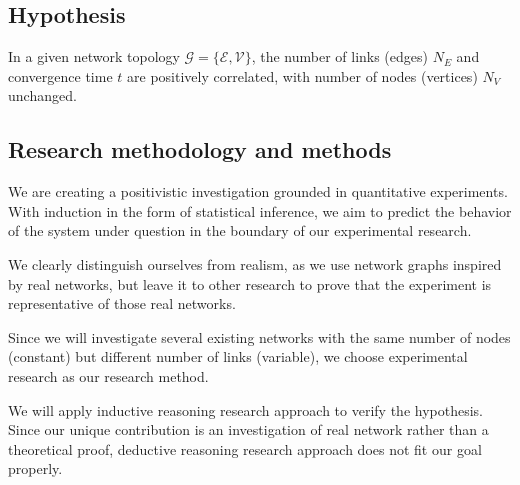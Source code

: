 \subsection{Hypothesis}
In a given network topology $\mathcal{G}=\{\mathcal{E}, \mathcal{V}\}$, the number of links (edges) $N_E$ and convergence time $t$ are positively correlated, with number of nodes (vertices) $N_V$ unchanged.

\subsection{Research methodology and methods}
We are creating a positivistic investigation grounded in quantitative experiments. With induction in the form of statistical inference, we aim to predict the behavior of the system under question in the boundary of our experimental research.

We clearly distinguish ourselves from realism, as we use network graphs inspired by real networks, but leave it to other research to prove that the experiment is representative of those real networks.

Since we will investigate several existing networks with the same number of nodes (constant) but different number of links (variable), we choose experimental research as our research method.

We will apply inductive reasoning research approach to verify the hypothesis. Since our unique contribution is an investigation of real network rather than a theoretical proof, deductive reasoning research approach does not fit our goal properly.
